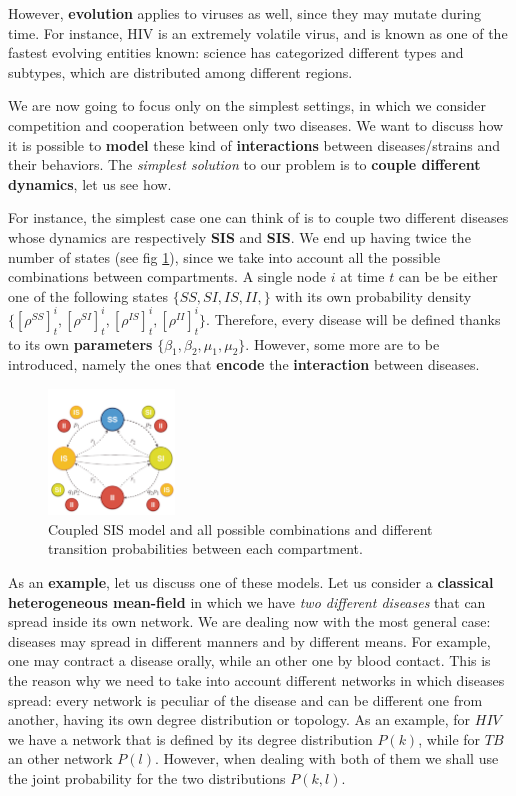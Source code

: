 \documentclass[../main/main.tex]{subfiles}
\begin{document}
However, \textbf{evolution} applies to viruses as well, since they may mutate during time. For instance, HIV is an extremely volatile virus, and is known as one of the fastest evolving entities known: science has categorized different types and subtypes, which are distributed among different regions.

We are now going to focus only on the simplest settings, in which we consider competition and cooperation between only two diseases. We want to discuss how it is possible to \textbf{model} these kind of \textbf{interactions} between diseases/strains and their behaviors. The \textit{simplest solution} to our problem is to \textbf{couple different dynamics}, let us see how.

For instance, the simplest case one can think of is to couple two different diseases whose dynamics are respectively \textbf{SIS} and \textbf{SIS}. We end up having twice the number of states (see fig \ref{fig:11_003}), since we take into account all the possible combinations between compartments. A single node $i$ at time $t$ can be be either one of the following states $\{SS, SI, IS, II,\}$ with its own probability density $\{ [\rho^{SS}]^i_t, [\rho^{SI}]^i_t,[\rho^{IS}]^i_t, [\rho^{II}]^i_t \}$. Therefore, every disease will be defined thanks to its own \textbf{parameters} $\{\beta_1, \beta_2, \mu_1, \mu_2\}$. However, some more are to be introduced, namely the ones that \textbf{encode} the \textbf{interaction} between diseases.

\begin{figure}[h!]
\centering
\includegraphics[width=0.3\textwidth]{../lessons/image/11/image003.png}
\caption{\label{fig:11_003} Coupled SIS model and all possible combinations and different transition probabilities between each compartment. }
\end{figure}

As an \textbf{example}, let us discuss one of these models. Let us consider a \textbf{classical heterogeneous mean-field} in which we have \textit{two different diseases} that can spread inside its own network. We are dealing now with the most general case: diseases may spread in different manners and by different means. For example, one may contract a disease orally, while an other one by blood contact. This is the reason why we need to take into account different networks in which diseases spread: every network is peculiar of the disease and can be different one from another, having its own degree distribution or topology. As an example, for $HIV$ we have a network that is defined by its degree distribution $P(k)$, while for $TB$ an other network $P(l)$. However, when dealing with both of them we shall use the joint probability for the two distributions $P(k,l)$.
\end{document}
